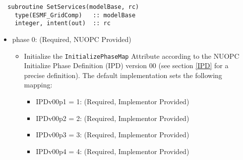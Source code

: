 \begin{verbatim}  subroutine SetServices(modelBase, rc)
    type(ESMF_GridComp)   :: modelBase
    integer, intent(out)  :: rc
\end{verbatim}

\begin{itemize}
\item phase 0: ({\sc Required, NUOPC Provided})
  \begin{itemize}
  \item Initialize the {\tt InitializePhaseMap} Attribute according to the NUOPC Initialize Phase Definition (IPD) version 00 (see section \ref{IPD} for a precise definition). The default implementation sets the following mapping:
    \begin{itemize}
    \item IPDv00p1 = 1: ({\sc Required, Implementor Provided})
    \item IPDv00p2 = 2: ({\sc Required, Implementor Provided})
    \item IPDv00p3 = 3: ({\sc Required, Implementor Provided})
    \item IPDv00p4 = 4: ({\sc Required, Implementor Provided})
    \end{itemize}  
  \end{itemize}  
\end{itemize}

